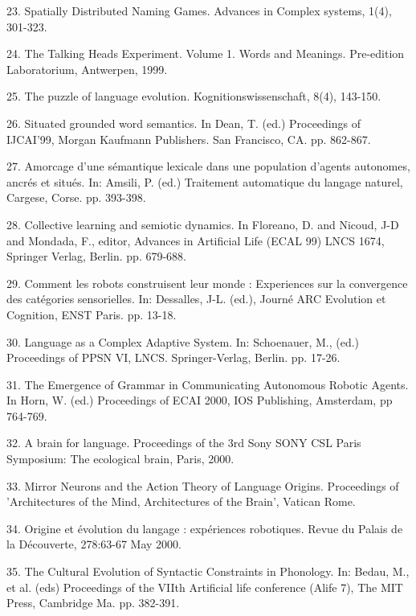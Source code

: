 23. \citet{Steels:99c} Spatially Distributed Naming Games. Advances in Complex systems, 1(4), 301-323. 

24. \citet{Steels:99d} The Talking Heads Experiment. Volume 1. Words and Meanings. Pre-edition Laboratorium, Antwerpen, 1999.

25. \citet{Steels:99e} The puzzle of language evolution. Kognitionswissenschaft, 8(4), 143-150. 

26. \citet{Steels:99f} Situated grounded word semantics. In Dean, T. (ed.) Proceedings of IJCAI'99, 
Morgan Kaufmann Publishers. San Francisco, CA. pp. 862-867. 

27. \citet{Steels:99g} Amorcage d'une s\'emantique lexicale dans une population d'agents autonomes, ancr\'es et 
situ\'es. In: Amsili, P. (ed.) Traitement automatique du langage naturel, Cargese, Corse. pp. 393-398. 

28. \citet{Steels:99h} Collective learning and semiotic dynamics. In Floreano, D. and 
Nicoud, J-D and Mondada, F., editor, Advances in Artificial Life (ECAL 99) LNCS 1674, Springer Verlag, Berlin. 
pp. 679-688. 

29. \citet{Kaplan:00a} Comment les robots construisent leur monde : Experiences sur la convergence des cat\'egories sensorielles. In: Dessalles, J-L. (ed.), Journ\'e ARC Evolution et Cognition, ENST Paris. pp. 13-18. 

30. \citet{Steels:00b} Language as a Complex Adaptive System. In: Schoenauer, M., (ed.) Proceedings of PPSN VI, LNCS. Springer-Verlag, Berlin. pp. 17-26. 

31. \citet{Steels:00c} The Emergence of Grammar in Communicating Autonomous Robotic Agents. In Horn, W. (ed.) Proceedings of ECAI 2000, 
IOS Publishing, Amsterdam, pp 764-769. 

32. \citet{Steels:00d} A brain for language. Proceedings of the 3rd Sony SONY CSL Paris Symposium: The ecological brain, Paris, 2000.

33. \citet{Steels:00e} Mirror Neurons and the Action Theory of Language Origins. Proceedings of 'Architectures of the Mind, Architectures of the Brain', Vatican Rome. 

34.\citet{Steels:00f} Origine et \'evolution du langage : exp\'eriences robotiques. Revue du Palais de la D\'ecouverte, 278:63-67 May 2000.

35. \citet{Steels:00g} The Cultural Evolution of Syntactic Constraints in Phonology. In: Bedau, M., et al.
(eds) Proceedings of the VIIth Artificial life conference (Alife 7), The MIT Press, Cambridge Ma. pp. 382-391. 

